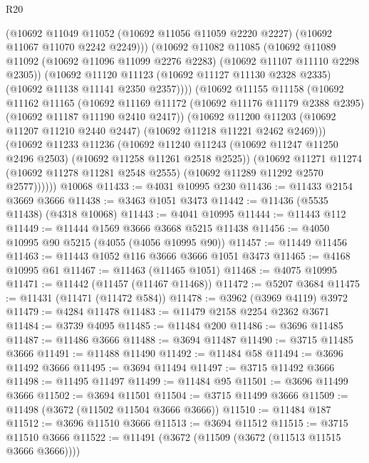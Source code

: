 \begin{lexlean}{R20}
\begin{coremodule}
            (@10692
              @11049
              @11052
              (@10692 @11056 @11059 @2220 @2227)
              (@10692 @11067 @11070 @2242 @2249)))
          (@10692
            @11082
            @11085
            (@10692
              @11089
              @11092
              (@10692 @11096 @11099 @2276 @2283)
              (@10692 @11107 @11110 @2298 @2305))
            (@10692
              @11120
              @11123
              (@10692 @11127 @11130 @2328 @2335)
              (@10692 @11138 @11141 @2350 @2357))))
        (@10692
          @11155
          @11158
          (@10692
            @11162
            @11165
            (@10692
              @11169
              @11172
              (@10692 @11176 @11179 @2388 @2395)
              (@10692 @11187 @11190 @2410 @2417))
            (@10692
              @11200
              @11203
              (@10692 @11207 @11210 @2440 @2447)
              (@10692 @11218 @11221 @2462 @2469)))
          (@10692
            @11233
            @11236
            (@10692
              @11240
              @11243
              (@10692 @11247 @11250 @2496 @2503)
              (@10692 @11258 @11261 @2518 @2525))
            (@10692
              @11271
              @11274
              (@10692 @11278 @11281 @2548 @2555)
              (@10692 @11289 @11292 @2570 @2577))))))
    @10068
@11433 := @4031 @10995 @230
@11436 := @11433 @2154 @3669 @3666
@11438 := @3463 @1051 @3473
@11442 := @11436 (@5535 @11438) (@4318 @10068)
@11443 := @4041 @10995
@11444 := @11443 @112
@11449 := @11444 @1569 @3666 @3668 @5215 @11438
@11456 := @4050 @10995 @90 @5215 (@4055 (@4056 @10995 @90))
@11457 := @11449 @11456
@11463 := @11443 @1052 @116 @3666 @3666 @1051 @3473
@11465 := @4168 @10995 @61
@11467 := @11463 (@11465 @1051)
@11468 := @4075 @10995
@11471 := @11442 (@11457 (@11467 @11468))
@11472 := @5207 @3684
@11475 := @11431 (@11471 (@11472 @584))
@11478 := @3962 (@3969 @4119) @3972
@11479 := @4284 @11478
@11483 := @11479 @2158 @2254 @2362 @3671
@11484 := @3739 @4095
@11485 := @11484 @200
@11486 := @3696 @11485
@11487 := @11486 @3666
@11488 := @3694 @11487
@11490 := @3715 @11485 @3666
@11491 := @11488 @11490
@11492 := @11484 @58
@11494 := @3696 @11492 @3666
@11495 := @3694 @11494
@11497 := @3715 @11492 @3666
@11498 := @11495 @11497
@11499 := @11484 @95
@11501 := @3696 @11499 @3666
@11502 := @3694 @11501
@11504 := @3715 @11499 @3666
@11509 := @11498 (@3672 (@11502 @11504 @3666 @3666))
@11510 := @11484 @187
@11512 := @3696 @11510 @3666
@11513 := @3694 @11512
@11515 := @3715 @11510 @3666
@11522 := @11491 (@3672 (@11509 (@3672 (@11513 @11515 @3666 @3666))))

\end{coremodule}
\end{lexlean}
